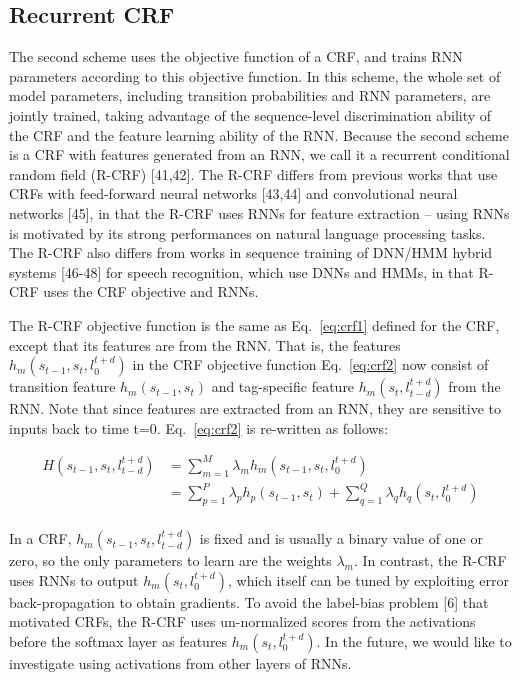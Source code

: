 \subsection{Recurrent CRF}

The second scheme uses the objective function of a CRF, and trains RNN
parameters according to this objective function. In this scheme, the whole set
of model parameters, including transition probabilities and RNN parameters, are
jointly trained, taking advantage of the sequence-level discrimination ability
of the CRF and the feature learning ability of the RNN. Because the second
scheme is a CRF with features generated from an RNN, we call it a recurrent
conditional random field (R-CRF) [41,42].  The R-CRF differs from previous
works that use CRFs with feed-forward neural networks [43,44] and convolutional
neural networks [45], in that the R-CRF uses RNNs for feature extraction –
using RNNs is motivated by its strong performances on natural language
processing tasks. The R-CRF also differs from works in sequence training of
DNN/HMM hybrid systems [46-48] for speech recognition, which use DNNs and HMMs,
in that R-CRF uses the CRF objective and RNNs. 

The R-CRF objective function is the same as Eq.~\ref{eq:crf1} defined for the
CRF, except that its features are from the RNN. That is, the features
$h_{m}(s_{t-1},s_{t},l_{0}^{t+d})$ in the CRF objective function
Eq.~\ref{eq:crf2} now consist of transition feature $h_{m}(s_{t-1},s_{t})$ and
tag-specific feature $h_{m}(s_{t},l_{t-d}^{t+d})$ from the RNN. Note that since
features are extracted from an RNN, they are sensitive to inputs back to time
t=0. Eq.~\ref{eq:crf2} is re-written as follows:

\begin{align*}
H(s_{t-1}, s_{t},l_{t-d}^{t+d}) & = \sum_{m=1}^{M} \lambda_{m} h_{m} (s_{t-1}, s_{t}, l_{0}^{t+d}) \\
 & = \sum_{p=1}^{P} \lambda_{p} h_{p}(s_{t-1}, s_{t}) + \sum_{q=1}^{Q} \lambda_{q} h_{q}(s_{t}, l_{0}^{t+d})\\
\end{align*}

In a CRF, $h_{m}(s_{t-1},s_{t},l_{t-d}^{t+d} )$ is fixed and is usually a
binary value of one or zero, so the only parameters to learn are the weights
$\lambda_{m}$.  In contrast, the R-CRF uses RNNs to output
$h_{m}(s_{t},l_{0}^{t+d})$, which itself can be tuned by exploiting error
back-propagation to obtain gradients. To avoid the label-bias problem [6] that
motivated CRFs, the R-CRF uses un-normalized scores from the activations before
the softmax layer as features $h_{m}(s_{t},l_{0}^{t+d})$. In the future, we would like
to investigate using activations from other layers of RNNs.  

